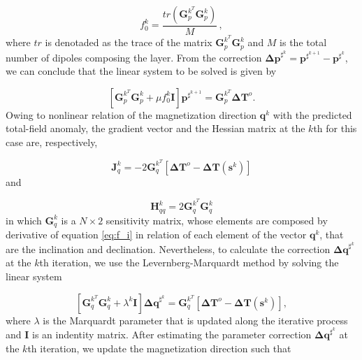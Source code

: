 \begin{equation}
f_{0}^{k} = \dfrac{tr(\mathbf{G}_{p}^{k^T} \mathbf{G}_{p}^{k})}{M} \, ,
\label{eq:norm_factor}
\end{equation}
where $tr$ is denotaded as the trace of the matrix $\mathbf{G}_{p}^{k^T} \mathbf{G}_{p}^{k}$ and $M$ is the total number of dipoles composing the layer. From the correction $\mathbf{\Delta p}^{\sharp^k} = \mathbf{p}^{\sharp^{k+1}} - \mathbf{p}^{\sharp^k}$, we can conclude that the linear system to be solved is given by

\begin{equation}
\left[ \mathbf{G}_{p}^{k^T} \mathbf{G}_{p}^{k} + \mu f_{0}^{k} \mathbf{I} \right] \mathbf{p}^{\sharp^{k+1}} = \mathbf{G}_{p}^{k^T} \mathbf{\Delta T}^o.
\label{eq:linear_sys_p}
\end{equation} 
Owing to nonlinear relation of the magnetization direction $\mathbf{q}^k$ with the predicted total-field anomaly, the gradient vector and the Hessian matrix at the $k$th for this case are, respectively,

\begin{equation}
\mathbf{J}_{q}^{k} = -2 \mathbf{G}_{q}^{k^T} [ \mathbf{\Delta T}^o -  \mathbf{\Delta T} (\mathbf{s}^k) ] 
\label{eq:grad_q}
\end{equation}   
and   

\begin{equation}
\mathbf{H}_{qq}^{k} = 2 \mathbf{G}_{q}^{k^T} \mathbf{G}_{q}^{k} 
\label{eq:hess_q}
\end{equation}
in which $\mathbf{G}_q^k$ is a $N \times 2$ sensitivity matrix, whose elements are composed by derivative of equation \ref{eq:f_i} in relation of each element of the vector $\mathbf{q}^k$, that are the inclination and declination. Nevertheless, to calculate the correction $\mathbf{\Delta q}^{\sharp^k}$ at the $k$th iteration, we use the Levernberg-Marquardt method \citep{aster2005} by solving the linear system

\begin{equation}
\left[ \mathbf{G}_{q}^{k^T} \mathbf{G}_{q}^{k} + \lambda^k \mathbf{I} \right] \mathbf{\Delta q}^{\sharp^k} = \mathbf{G}_{q}^{k^T}[ \mathbf{\Delta T}^o -  \mathbf{\Delta T} (\mathbf{s}^k) ],
\label{eq:linear_sys_q}
\end{equation}
where $\lambda$ is the Marquardt parameter that is updated along the iterative process and $\mathbf{I}$ is an indentity matrix. After estimating the parameter correction $\mathbf{\Delta q}^{\sharp^k}$ at the $k$th iteration, we update the magnetization direction such that 

